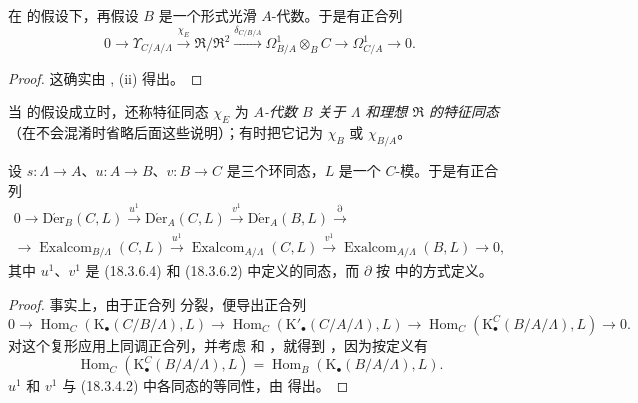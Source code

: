 \begin{corollary}[20.6.23]
\label{0.20.6.23-fr}
在  的假设下，再假设 $B$ 是一个形式光滑
$A$-代数。于是有正合列
\begin{equation}
\tag{20.6.23.1}
\label{0.20.6.23.1-fr}
  0\to\Upsilon_{C/A/\Lambda}\xrightarrow{\chi_E}
  \mathfrak{R}/\mathfrak{R}^2\xrightarrow{\delta_{C/B/A}}
  \Omega^1_{B/A}\otimes_B C\to\Omega^1_{C/A}\to0.
\end{equation}
\end{corollary}

\begin{proof}
这确实由 , (ii) 得出。
\end{proof}

\begin{env}[20.6.24]
\label{0.20.6.24-fr}
当  的假设成立时，还称特征同态 $\chi_E$ 为
\emph{$A$-代数 $B$ 关于 $\Lambda$ 和理想 $\mathfrak{R}$ 的特征同态}
（在不会混淆时省略后面这些说明）；有时把它记为 $\chi_B$ 或
$\chi_{B/A}$。
\end{env}

\begin{proposition}[20.6.25]
\label{0.20.6.25-fr}
设 $s:\Lambda\to A$、$u:A\to B$、$v:B\to C$ 是三个环同态，$L$ 是一个
$C$-模。于是有正合列
\begin{equation}
\tag{20.6.25.1}
\label{0.20.6.25.1-fr}
\begin{split}
  0\to\operatorname{D\acute{e}r}_B(C,L)\xrightarrow{u^1}
  \operatorname{D\acute{e}r}_A(C,L)\xrightarrow{v^1}
  \operatorname{D\acute{e}r}_A(B,L)\xrightarrow{\partial} \\
  \to\operatorname{Exalcom}_{B/\Lambda}(C,L)\xrightarrow{u^1}
  \operatorname{Exalcom}_{A/\Lambda}(C,L)\xrightarrow{v^1}
  \operatorname{Exalcom}_{A/\Lambda}(B,L)\to0,
\end{split}
\end{equation}
其中 $u^1$、$v^1$ 是 (18.3.6.4) 和 (18.3.6.2) 中定义的同态，而
$\partial$ 按  中的方式定义。
\end{proposition}

\begin{proof}
事实上，由于正合列  分裂，便导出正合列
\[
  0\to\operatorname{Hom}_C(\mathrm{K}_\bullet(C/B/\Lambda),L)\to
  \operatorname{Hom}_C(\mathrm{K}'_\bullet(C/A/\Lambda),L)\to
  \operatorname{Hom}_C(\mathrm{K}^C_\bullet(B/A/\Lambda),L)\to0.
\]
对这个复形应用上同调正合列，并考虑  和
，就得到 ，因为按定义有
\[
  \operatorname{Hom}_C(\mathrm{K}^C_\bullet(B/A/\Lambda),L)
  =\operatorname{Hom}_B(\mathrm{K}_\bullet(B/A/\Lambda),L).
\]
$u^1$ 和 $v^1$ 与 (18.3.4.2) 中各同态的等同性，由
 得出。
\end{proof}

